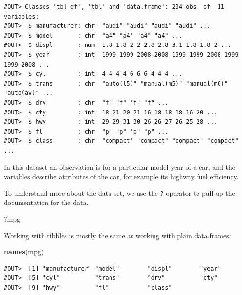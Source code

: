 \documentclass[]{book}
\newenvironment{Shaded}{\begin{snugshade}}{\end{snugshade}}
\newcommand{\KeywordTok}[1]{\textcolor[rgb]{0.13,0.29,0.53}{\textbf{#1}}}
\newcommand{\NormalTok}[1]{#1}
\newcommand{\OperatorTok}[1]{\textcolor[rgb]{0.81,0.36,0.00}{\textbf{#1}}}
\begin{document}
\begin{verbatim}
#OUT> Classes 'tbl_df', 'tbl' and 'data.frame': 234 obs. of  11 variables:
#OUT>  $ manufacturer: chr  "audi" "audi" "audi" "audi" ...
#OUT>  $ model       : chr  "a4" "a4" "a4" "a4" ...
#OUT>  $ displ       : num  1.8 1.8 2 2 2.8 2.8 3.1 1.8 1.8 2 ...
#OUT>  $ year        : int  1999 1999 2008 2008 1999 1999 2008 1999 1999 2008 ...
#OUT>  $ cyl         : int  4 4 4 4 6 6 6 4 4 4 ...
#OUT>  $ trans       : chr  "auto(l5)" "manual(m5)" "manual(m6)" "auto(av)" ...
#OUT>  $ drv         : chr  "f" "f" "f" "f" ...
#OUT>  $ cty         : int  18 21 20 21 16 18 18 18 16 20 ...
#OUT>  $ hwy         : int  29 29 31 30 26 26 27 26 25 28 ...
#OUT>  $ fl          : chr  "p" "p" "p" "p" ...
#OUT>  $ class       : chr  "compact" "compact" "compact" "compact" ...
\end{verbatim}

In this dataset an observation is for a particular model-year of a car, and the variables describe attributes of the car, for example its highway fuel efficiency.

To understand more about the data set, we use the \texttt{?} operator to pull up the documentation for the data.

\begin{Shaded}
\begin{Highlighting}[]
\NormalTok{?mpg}
\end{Highlighting}
\end{Shaded}

Working with tibbles is mostly the same as working with plain data.frames:

\begin{Shaded}
\begin{Highlighting}[]
\KeywordTok{names}\NormalTok{(mpg)}
\end{Highlighting}
\end{Shaded}

\begin{verbatim}
#OUT>  [1] "manufacturer" "model"        "displ"        "year"        
#OUT>  [5] "cyl"          "trans"        "drv"          "cty"         
#OUT>  [9] "hwy"          "fl"           "class"
\end{verbatim}

\begin{Shaded}
\end{Shaded}
\end{document}
